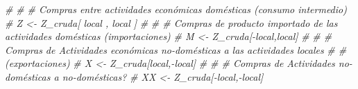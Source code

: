\documentclass[
]{article}
\newenvironment{Shaded}{\begin{snugshade}}{\end{snugshade}}
\newcommand{\CommentTok}[1]{\textcolor[rgb]{0.56,0.35,0.01}{\textit{#1}}}
\begin{document}
\begin{Shaded}
\begin{Highlighting}[]
\CommentTok{\# }
\CommentTok{\# \# Compras entre actividades económicas domésticas (consumo intermedio)}
\CommentTok{\# Z \textless{}{-} Z\_cruda[  local  ,  local   ]}
\CommentTok{\# }
\CommentTok{\# \# Compras de producto importado de las actividades domésticas (importaciones)}
\CommentTok{\# M \textless{}{-} Z\_cruda[{-}local,local]}
\CommentTok{\# }
\CommentTok{\# \# Compras de Actividades económicas no{-}domésticas a las actividades locales}
\CommentTok{\# \# (exportaciones)}
\CommentTok{\# X \textless{}{-} Z\_cruda[local,{-}local]}
\CommentTok{\# }
\CommentTok{\# \# Compras de Actividades no{-}domésticas a no{-}domésticas?}
\CommentTok{\# XX \textless{}{-} Z\_cruda[{-}local,{-}local]}
\end{Highlighting}
\end{Shaded}
\end{document}
